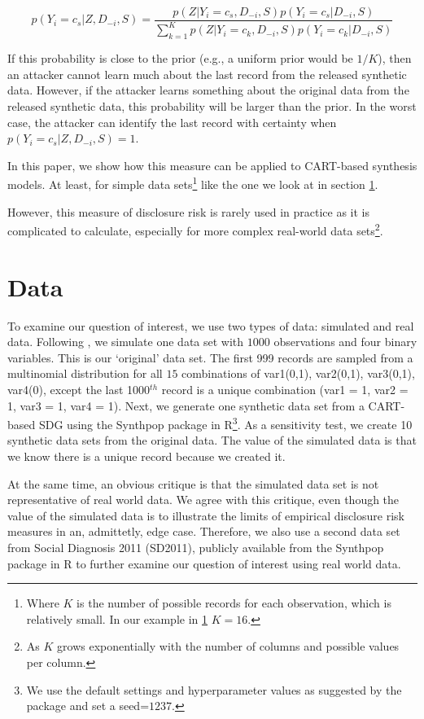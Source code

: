 \documentclass[a4paper,11pt]{style/uneceart}
\begin{document}
\begin{equation}\label{eq:bayesian}
p(Y_i = c_s|Z, D_{-i}, S) = \frac{p(Z|Y_i = c_s, D_{-i}, S)p(Y_i=c_s|D_{-i}, S)}{\sum_{k=1}^Kp(Z|Y_i = c_k, D_{-i}, S)p(Y_i=c_k|D_{-i}, S)}
\end{equation}

If this probability is close to the prior (e.g., a uniform prior would be $1/K$), then an attacker cannot learn much about the last record from the released synthetic data. However, if the attacker learns something about the original data from the released synthetic data, this probability will be larger than the prior. In the worst case, the attacker can identify the last record with certainty when $p(Y_i = c_s|Z, D_{-i}, S) = 1$.

In this paper, we show how this measure can be applied to CART-based synthesis models. At least, for simple data sets\footnote{Where $K$ is the number of possible records for each observation, which is relatively small. In our example in \ref{sec:data} $K = 16$.} like the one we look at in section \ref{sec:data}. 

However, this measure of disclosure risk is rarely used in practice as it is complicated to calculate, especially for more complex real-world data sets\footnote{As $K$ grows exponentially with the number of columns and possible values per column.}.

\section{Data}\label{sec:data}

To examine our question of interest, we use two types of data: simulated and real data.  Following \citet{reiter2014bayesian}, we simulate one data set with $1000$ observations and four binary variables.  This is our `original' data set.  The first 999 records are sampled from a multinomial distribution for all $15$ combinations of var1(0,1), var2(0,1), var3(0,1), var4(0), except the last 1000$^{th}$ record is a unique combination (var1 = 1, var2 = 1, var3 = 1, var4 = 1).  Next, we generate one synthetic data set from a CART-based SDG using the Synthpop package in R\footnote{We use the default settings and hyperparameter values as suggested by the package and set a seed=$1237$.}.  As a sensitivity test, we create 10 synthetic data sets from the original data.  The value of the simulated data is that we know there is a unique record because we created it.

At the same time, an obvious critique is that the simulated data set is not representative of real world data.  We agree with this critique, even though the value of the simulated data is to illustrate the limits of empirical disclosure risk measures in an, admittetly, edge case.  Therefore, we also use a second data set from Social Diagnosis 2011 (SD2011), publicly available from the Synthpop package in R to further examine our question of interest using real world data.
\end{document}

